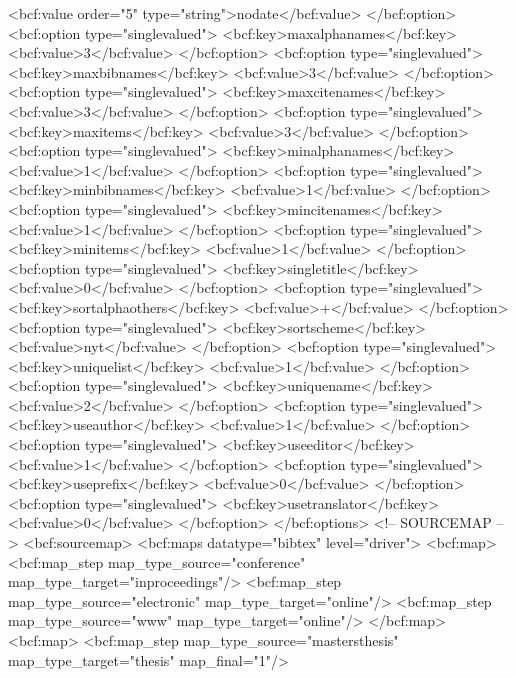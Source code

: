       <bcf:value order="5" type="string">nodate</bcf:value>
    </bcf:option>
    <bcf:option type="singlevalued">
      <bcf:key>maxalphanames</bcf:key>
      <bcf:value>3</bcf:value>
    </bcf:option>
    <bcf:option type="singlevalued">
      <bcf:key>maxbibnames</bcf:key>
      <bcf:value>3</bcf:value>
    </bcf:option>
    <bcf:option type="singlevalued">
      <bcf:key>maxcitenames</bcf:key>
      <bcf:value>3</bcf:value>
    </bcf:option>
    <bcf:option type="singlevalued">
      <bcf:key>maxitems</bcf:key>
      <bcf:value>3</bcf:value>
    </bcf:option>
    <bcf:option type="singlevalued">
      <bcf:key>minalphanames</bcf:key>
      <bcf:value>1</bcf:value>
    </bcf:option>
    <bcf:option type="singlevalued">
      <bcf:key>minbibnames</bcf:key>
      <bcf:value>1</bcf:value>
    </bcf:option>
    <bcf:option type="singlevalued">
      <bcf:key>mincitenames</bcf:key>
      <bcf:value>1</bcf:value>
    </bcf:option>
    <bcf:option type="singlevalued">
      <bcf:key>minitems</bcf:key>
      <bcf:value>1</bcf:value>
    </bcf:option>
    <bcf:option type="singlevalued">
      <bcf:key>singletitle</bcf:key>
      <bcf:value>0</bcf:value>
    </bcf:option>
    <bcf:option type="singlevalued">
      <bcf:key>sortalphaothers</bcf:key>
      <bcf:value>+</bcf:value>
    </bcf:option>
    <bcf:option type="singlevalued">
      <bcf:key>sortscheme</bcf:key>
      <bcf:value>nyt</bcf:value>
    </bcf:option>
    <bcf:option type="singlevalued">
      <bcf:key>uniquelist</bcf:key>
      <bcf:value>1</bcf:value>
    </bcf:option>
    <bcf:option type="singlevalued">
      <bcf:key>uniquename</bcf:key>
      <bcf:value>2</bcf:value>
    </bcf:option>
    <bcf:option type="singlevalued">
      <bcf:key>useauthor</bcf:key>
      <bcf:value>1</bcf:value>
    </bcf:option>
    <bcf:option type="singlevalued">
      <bcf:key>useeditor</bcf:key>
      <bcf:value>1</bcf:value>
    </bcf:option>
    <bcf:option type="singlevalued">
      <bcf:key>useprefix</bcf:key>
      <bcf:value>0</bcf:value>
    </bcf:option>
    <bcf:option type="singlevalued">
      <bcf:key>usetranslator</bcf:key>
      <bcf:value>0</bcf:value>
    </bcf:option>
  </bcf:options>
  <!-- SOURCEMAP -->
  <bcf:sourcemap>
    <bcf:maps datatype="bibtex" level="driver">
      <bcf:map>
        <bcf:map_step map_type_source="conference" map_type_target="inproceedings"/>
        <bcf:map_step map_type_source="electronic" map_type_target="online"/>
        <bcf:map_step map_type_source="www" map_type_target="online"/>
      </bcf:map>
      <bcf:map>
        <bcf:map_step map_type_source="mastersthesis" map_type_target="thesis" map_final="1"/>

